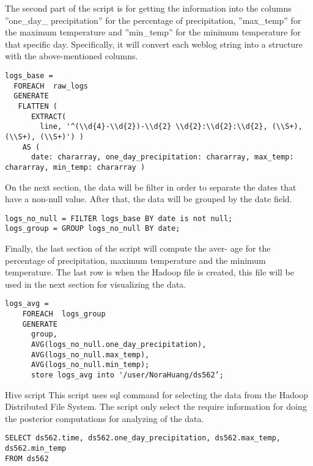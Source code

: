 The second part of the script is for getting the information into the columns ''one\_day\_ precipitation'' for the percentage of precipitation, ''max\_temp'' for the maximum temperature and ''min\_temp'' for the minimum temperature for that specific day. Specifically, it will convert each weblog string into a structure with the above-mentioned columns.

\begin{lstlisting}
logs_base =
  FOREACH  raw_logs
  GENERATE
   FLATTEN (   	 
      EXTRACT(
        line, '^(\\d{4}-\\d{2})-\\d{2} \\d{2}:\\d{2}:\\d{2}, (\\S+), (\\S+), (\\S+)') )
    AS (
      date: chararray, one_day_precipitation: chararray, max_temp: chararray, min_temp: chararray )
\end{lstlisting}

On the next section, the data will be filter in order to separate the dates that have a non-null value. After that, the data will be grouped by the date field.  

\begin{lstlisting}
logs_no_null = FILTER logs_base BY date is not null; 
logs_group = GROUP logs_no_null BY date;
\end{lstlisting}

Finally, the last section of the script will compute the aver- age for the percentage of precipitation, maximum temperature and the minimum temperature. The last row is when the Hadoop file is created, this file will be used in the next section for visualizing the data.

\begin{lstlisting}
logs_avg = 
	FOREACH  logs_group
    GENERATE
      group,
      AVG(logs_no_null.one_day_precipitation),
      AVG(logs_no_null.max_temp),
      AVG(logs_no_null.min_temp);
      store logs_avg into '/user/NoraHuang/ds562’;
\end{lstlisting}

{Hive script}
This script uses sql command for selecting the data from the Hadoop Distributed File System. The script only select the require information for doing the posterior computations for analyzing of the data.

\begin{lstlisting}
SELECT ds562.time, ds562.one_day_precipitation, ds562.max_temp, ds562.min_temp 
FROM ds562
\end{lstlisting}

